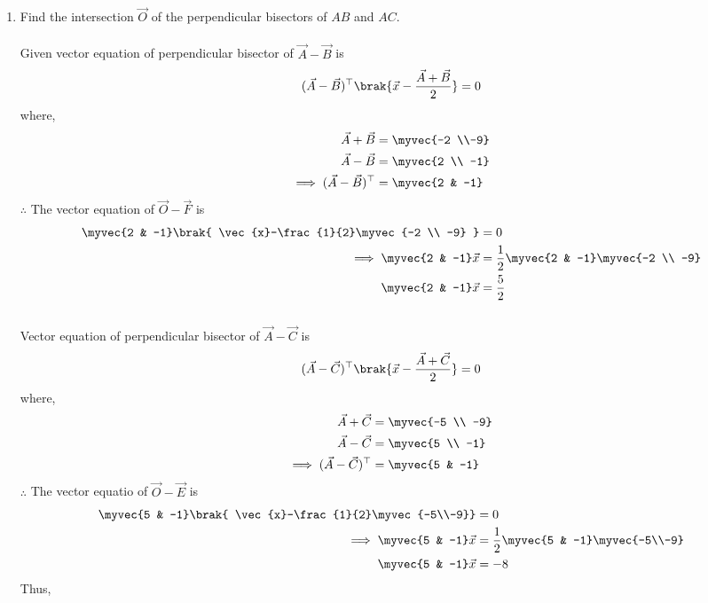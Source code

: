 \documentclass[11pt]{book}
\begin{document}
\begin{enumerate}[label=\thesection.\arabic*.,ref=\thesection.\theenumi]
\item Find the intersection $\vec{O}$ of the perpendicular bisectors of $AB$ and $AC$.\\
\solution\\
Given vector equation of perpendicular bisector of $\vec{A}-\vec{B}$ is
\begin{align}
 (\vec{A}-\vec{B})^\top  \brak{ \vec{x} - \frac{\vec{A}+\vec{B}}{2}} = 0
\end{align}
where,
\begin{align}
\vec{A}+\vec{B} &= \myvec{-2 \\-9}\\
\vec{A}-\vec{B} &= \myvec{2 \\ -1}\\
\implies (\vec{A}-\vec{B})^\top &= \myvec{2 & -1}
\end{align}
$\therefore $ The vector equation of $\vec{O}-\vec{F}$ is
\begin{align}
\myvec{2 & -1} \brak{ \vec{x}-\frac{1}{2}\myvec{-2 \\ -9} } &= 0\\
\implies \myvec{2 & -1}\vec{x} &= \frac{1}{2}\myvec{2 & -1}\myvec{-2 \\ -9}\\
\myvec{2 & -1}\vec{x} &= \frac{5}{2}
\end{align}\\
Vector equation of perpendicular bisector of $\vec{A}-\vec{C}$ is
\begin{align}
(\vec{A}-\vec{C})^\top\brak{ \vec{x} - \frac{\vec{A}+\vec{C}}{2}} = 0
\end{align}
where,
\begin{align}
\vec{A}+\vec{C} &= \myvec{-5 \\ -9}\\
\vec{A}-\vec{C} &= \myvec{5 \\ -1}\\
\implies (\vec{A}-\vec{C})^\top &= \myvec{5 & -1}
\end{align}
$\therefore $ The vector equatio of $\vec{O}-\vec{E}$ is
\begin{align}
\myvec{5 & -1}\brak{ \vec{x}-\frac{1}{2}\myvec{-5\\-9}} &= 0\\
\implies \myvec{5 & -1}\vec{x} &= \frac{1}{2}\myvec{5 & -1}\myvec{-5\\-9}\\
\myvec{5 & -1}\vec{x} &= -8
\end{align}
Thus,
\begin{align}

\end{align}
\end{enumerate}
\end{document}
